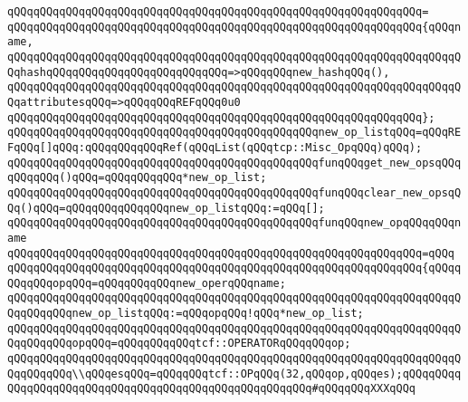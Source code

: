 \verb|qQQqqQQqqQQqqQQqqQQqqQQqqQQqqQQqqQQqqQQqqQQqqQQqqQQqqQQqqQQqqQQq=|\newline
\verb|qQQqqQQqqQQqqQQqqQQqqQQqqQQqqQQqqQQqqQQqqQQqqQQqqQQqqQQqqQQqqQQq{qQQqname,|\newline
\verb|qQQqqQQqqQQqqQQqqQQqqQQqqQQqqQQqqQQqqQQqqQQqqQQqqQQqqQQqqQQqqQQqqQQqqQQqhashqQQqqQQqqQQqqQQqqQQqqQQqqQQq=>qQQqqQQqnew_hashqQQq(),|\newline
\verb|qQQqqQQqqQQqqQQqqQQqqQQqqQQqqQQqqQQqqQQqqQQqqQQqqQQqqQQqqQQqqQQqqQQqqQQqattributesqQQq=>qQQqqQQqREFqQQq0u0|\newline
\verb|qQQqqQQqqQQqqQQqqQQqqQQqqQQqqQQqqQQqqQQqqQQqqQQqqQQqqQQqqQQqqQQq};|\newline
\newline
\verb|qQQqqQQqqQQqqQQqqQQqqQQqqQQqqQQqqQQqqQQqqQQqqQQqnew_op_listqQQq=qQQqREFqQQq[]qQQq:qQQqqQQqqQQqRef(qQQqList(qQQqtcp::Misc_OpqQQq)qQQq);|\newline
\newline
\verb|qQQqqQQqqQQqqQQqqQQqqQQqqQQqqQQqqQQqqQQqqQQqqQQqfunqQQqget_new_opsqQQqqQQqqQQq()qQQq=qQQqqQQqqQQq*new_op_list;|\newline
\verb|qQQqqQQqqQQqqQQqqQQqqQQqqQQqqQQqqQQqqQQqqQQqqQQqfunqQQqclear_new_opsqQQq()qQQq=qQQqqQQqqQQqqQQqnew_op_listqQQq:=qQQq[];|\newline
\newline
\verb|qQQqqQQqqQQqqQQqqQQqqQQqqQQqqQQqqQQqqQQqqQQqqQQqfunqQQqnew_opqQQqqQQqname|\newline
\verb|qQQqqQQqqQQqqQQqqQQqqQQqqQQqqQQqqQQqqQQqqQQqqQQqqQQqqQQqqQQqqQQq=qQQq|\newline
\verb|qQQqqQQqqQQqqQQqqQQqqQQqqQQqqQQqqQQqqQQqqQQqqQQqqQQqqQQqqQQqqQQq{qQQqqQQqqQQqopqQQq=qQQqqQQqqQQqnew_operqQQqname;|\newline
\newline
\verb|qQQqqQQqqQQqqQQqqQQqqQQqqQQqqQQqqQQqqQQqqQQqqQQqqQQqqQQqqQQqqQQqqQQqqQQqqQQqqQQqnew_op_listqQQq:=qQQqopqQQq!qQQq*new_op_list;|\newline
\newline
\verb|qQQqqQQqqQQqqQQqqQQqqQQqqQQqqQQqqQQqqQQqqQQqqQQqqQQqqQQqqQQqqQQqqQQqqQQqqQQqqQQqopqQQq=qQQqqQQqqQQqtcf::OPERATORqQQqqQQqop;|\newline
\newline
\verb|qQQqqQQqqQQqqQQqqQQqqQQqqQQqqQQqqQQqqQQqqQQqqQQqqQQqqQQqqQQqqQQqqQQqqQQqqQQqqQQq\\qQQqesqQQq=qQQqqQQqtcf::OPqQQq(32,qQQqop,qQQqes);qQQqqQQqqQQqqQQqqQQqqQQqqQQqqQQqqQQqqQQqqQQqqQQqqQQqqQQq#qQQqqQQqXXXqQQq|\newline
